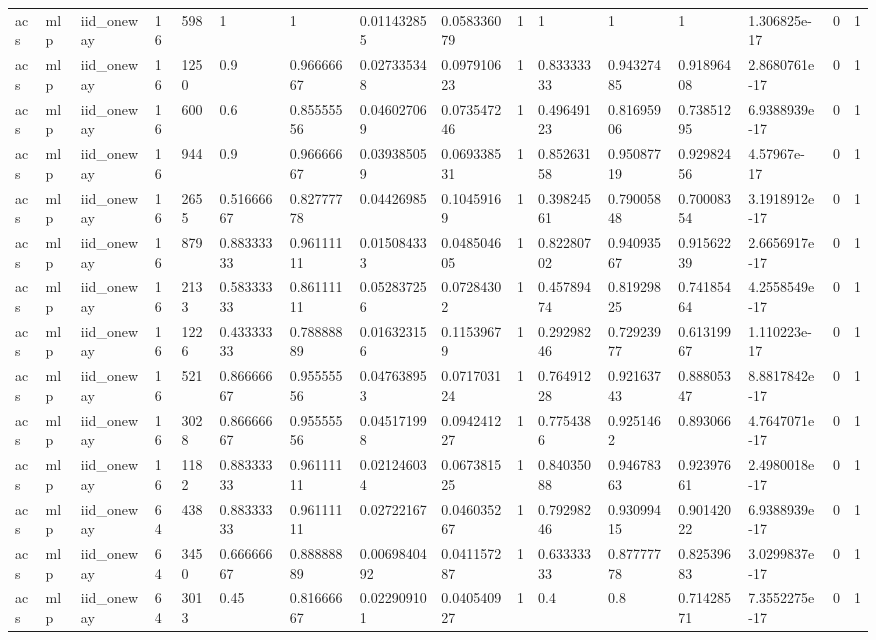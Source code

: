 \begin{tabular}{llllllllllllllll}
acs & mlp & iid\_oneway & 16 & 598 & 1 & 1 & 0.011432855 & 0.058336079 & 1 & 1 & 1 & 1 & 1.306825e-17 & 0 & 1 \\
acs & mlp & iid\_oneway & 16 & 1250 & 0.9 & 0.96666667 & 0.027335348 & 0.097910623 & 1 & 0.83333333 & 0.94327485 & 0.91896408 & 2.8680761e-17 & 0 & 1 \\
acs & mlp & iid\_oneway & 16 & 600 & 0.6 & 0.85555556 & 0.046027069 & 0.073547246 & 1 & 0.49649123 & 0.81695906 & 0.73851295 & 6.9388939e-17 & 0 & 1 \\
acs & mlp & iid\_oneway & 16 & 944 & 0.9 & 0.96666667 & 0.039385059 & 0.069338531 & 1 & 0.85263158 & 0.95087719 & 0.92982456 & 4.57967e-17 & 0 & 1 \\
acs & mlp & iid\_oneway & 16 & 2655 & 0.51666667 & 0.82777778 & 0.04426985 & 0.10459169 & 1 & 0.39824561 & 0.79005848 & 0.70008354 & 3.1918912e-17 & 0 & 1 \\
acs & mlp & iid\_oneway & 16 & 879 & 0.88333333 & 0.96111111 & 0.015084333 & 0.048504605 & 1 & 0.82280702 & 0.94093567 & 0.91562239 & 2.6656917e-17 & 0 & 1 \\
acs & mlp & iid\_oneway & 16 & 2133 & 0.58333333 & 0.86111111 & 0.052837256 & 0.07284302 & 1 & 0.45789474 & 0.81929825 & 0.74185464 & 4.2558549e-17 & 0 & 1 \\
acs & mlp & iid\_oneway & 16 & 1226 & 0.43333333 & 0.78888889 & 0.016323156 & 0.11539679 & 1 & 0.29298246 & 0.72923977 & 0.61319967 & 1.110223e-17 & 0 & 1 \\
acs & mlp & iid\_oneway & 16 & 521 & 0.86666667 & 0.95555556 & 0.047638953 & 0.071703124 & 1 & 0.76491228 & 0.92163743 & 0.88805347 & 8.8817842e-17 & 0 & 1 \\
acs & mlp & iid\_oneway & 16 & 3028 & 0.86666667 & 0.95555556 & 0.045171998 & 0.094241227 & 1 & 0.7754386 & 0.9251462 & 0.893066 & 4.7647071e-17 & 0 & 1 \\
acs & mlp & iid\_oneway & 16 & 1182 & 0.88333333 & 0.96111111 & 0.021246034 & 0.067381525 & 1 & 0.84035088 & 0.94678363 & 0.92397661 & 2.4980018e-17 & 0 & 1 \\
acs & mlp & iid\_oneway & 64 & 438 & 0.88333333 & 0.96111111 & 0.02722167 & 0.046035267 & 1 & 0.79298246 & 0.93099415 & 0.90142022 & 6.9388939e-17 & 0 & 1 \\
acs & mlp & iid\_oneway & 64 & 3450 & 0.66666667 & 0.88888889 & 0.0069840492 & 0.041157287 & 1 & 0.63333333 & 0.87777778 & 0.82539683 & 3.0299837e-17 & 0 & 1 \\
acs & mlp & iid\_oneway & 64 & 3013 & 0.45 & 0.81666667 & 0.022909101 & 0.040540927 & 1 & 0.4 & 0.8 & 0.71428571 & 7.3552275e-17 & 0 & 1 \\

\end{tabular}

